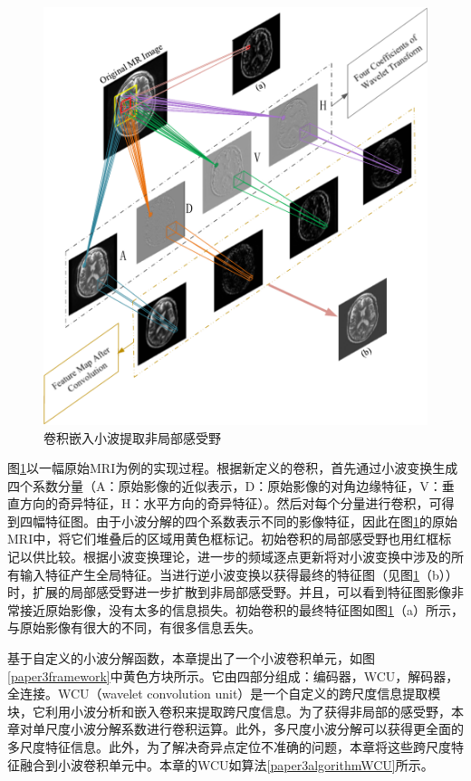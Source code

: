     \begin{figure}[ht]
      \centering
      \includegraphics[width=0.8\linewidth]{figs/paper3nonLocalField2.pdf}
      \caption{卷积嵌入小波提取非局部感受野}\label{paper3nonLocalField2}
    \end{figure}
图\ref{paper3nonLocalField2}以一幅原始MRI为例的实现过程。根据新定义的卷积，首先通过小波变换生成四个系数分量（A：原始影像的近似表示，D：原始影像的对角边缘特征，V：垂直方向的奇异特征，H：水平方向的奇异特征）。然后对每个分量进行卷积，可得到四幅特征图。由于小波分解的四个系数表示不同的影像特征，因此在图\ref{paper3nonLocalField2}的原始MRI中，将它们堆叠后的区域用黄色框标记。初始卷积的局部感受野也用红框标记以供比较。根据小波变换理论，进一步的频域逐点更新将对小波变换中涉及的所有输入特征产生全局特征。当进行逆小波变换以获得最终的特征图（见图\ref{paper3nonLocalField2}（b））时，扩展的局部感受野进一步扩散到非局部感受野。并且，可以看到特征图影像非常接近原始影像，没有太多的信息损失。初始卷积的最终特征图如图\ref{paper3nonLocalField2}（a）所示，与原始影像有很大的不同，有很多信息丢失。

基于自定义的小波分解函数，本章提出了一个小波卷积单元，如图\ref{paper3framework}中黄色方块所示。它由四部分组成：编码器，WCU，解码器，全连接。WCU（wavelet convolution unit）是一个自定义的跨尺度信息提取模块，它利用小波分析和嵌入卷积来提取跨尺度信息。为了获得非局部的感受野，本章对单尺度小波分解系数进行卷积运算。此外，多尺度小波分解可以获得更全面的多尺度特征信息。此外，为了解决奇异点定位不准确的问题，本章将这些跨尺度特征融合到小波卷积单元中。本章的WCU如算法\ref{paper3algorithmWCU}所示。


